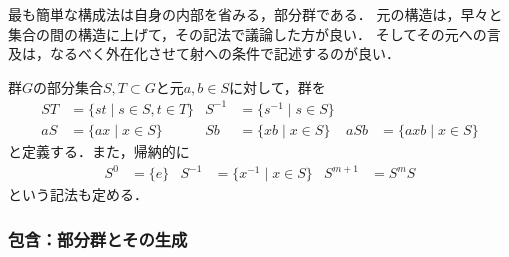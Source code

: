 \documentclass[uplatex,dvipdfmx]{jsreport}
\begin{document}
\begin{tcolorbox}[colframe=ForestGreen, colback=ForestGreen!10!white, breakable ,colbacktitle=ForestGreen!40!white, coltitle=black,fonttitle=\bfseries\sffamily,
    title=]
    最も簡単な構成法は自身の内部を省みる，部分群である．
    元の構造は，早々と集合の間の構造に上げて，その記法で議論した方が良い．
    そしてその元への言及は，なるべく外在化させて射への条件で記述するのが良い．
\end{tcolorbox}

\begin{notation}
    群$G$の部分集合$S,T\subset G$と元$a,b\in S$に対して，群を
    \begin{align*}
        ST&=\{ st\mid s\in S,t\in T \} &S^{-1}&=\{s^{-1}\mid s\in S\}\\
        aS&=\{ax\mid x\in S\}&Sb&=\{xb\mid x\in S\}&aSb&=\{axb\mid x\in S\}
    \end{align*}
    と定義する．また，帰納的に
    \begin{align*}
        S^0&=\{e\} & S^{-1}&=\{x^{-1}\mid x\in S\} & S^{m+1}&= S^mS 
    \end{align*}
    という記法も定める．
\end{notation}

\subsubsection{包含：部分群とその生成}
\end{document}
